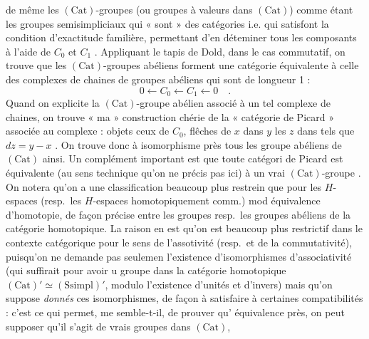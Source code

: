 \documentclass[11pt,a4paper]{article}
\begin{document}
de même les $(\mathrm{Cat})$-groupes (ou groupes à valeurs dans
$(\mathrm{Cat})$) comme étant les groupes semisimpliciaux qui « sont » des
catégories i.e. qui satisfont la condition d'exactitude familière, permettant
d'en déteminer tous les composants à l'aide de $C_{0}$ et $C_{1}$ .
Appliquant le tapis de Dold, dans le cas commutatif, on trouve que les
$(\mathrm{Cat})$-groupes abéliens forment une catégorie équivalente à celle des
complexes de chaines de groupes abéliens qui sont de longueur 1 :
\[
0 \leftarrow C_{0} \leftarrow C_{1} \leftarrow 0 \quad .
\]
Quand on explicite la $(\mathrm{Cat})$-groupe abélien associé à un tel complexe
de chaines, on trouve « ma » construction chérie de la « catégorie de Picard »
associée au complexe : objets ceux de $C_{0}$, flêches de $x$ dans $y$ les $z$
dans  tels que $dz = y - x$ . On trouve donc à isomorphisme près
tous les groupe abéliens de $(\mathrm{Cat})$ ainsi. Un complément
important est que toute catégori de Picard  est équivalente (au sens technique qu'on ne précis pas
ici) à un vrai $(\mathrm{Cat})$-groupe . 
\marginal{\struck{\ill{}}}
On notera qu'on a une classification beaucoup plus restrein que pour les
$H$-espaces (resp.\ les $H$-espaces homotopiquement comm.) mod
équivalence d'homotopie, de façon précise entre les groupes resp.\ les
groupes abéliens de la catégorie homotopique. La raison en est qu'on est
beaucoup plus restrictif dans le contexte catégorique pour le sens de
l'assotivité (resp.\ et de la commutativité), puisqu'on ne demande pas
seulemen l'existence d'isomorphismes d'associativité (qui suffirait
pour avoir u groupe dans la catégorie homotopique
$(\mathrm{Cat})' \simeq (\mathrm{Ssimpl})'$, modulo l'existence d'unités et
d'invers) mais qu'on suppose \emph{donnés} ces isomorphismes, de façon
à satisfaire à certaines compatibilités : c'est ce qui permet, me semble-t-il,
de prouver qu' équivalence près, on peut supposer qu'il s'agit de vrais
groupes dans $(\mathrm{Cat})$, 
\end{document}
